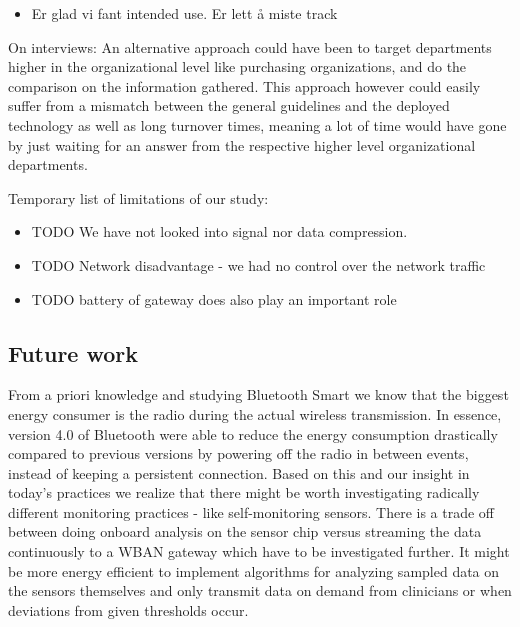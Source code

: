 \begin{itemize}

  \item Er glad vi fant intended use. Er lett å miste track 

\end{itemize}


On interviews: An alternative approach could have been to target departments higher in the organizational level like purchasing organizations, and do the comparison on the information gathered. This approach however could easily suffer from a mismatch between the general guidelines and the deployed technology as well as long turnover times, meaning a lot of time would have gone by just waiting for an answer from the respective higher level organizational departments.

Temporary list of limitations of our study:

\begin{itemize}

  \item TODO We have not looked into signal nor data compression.
  \item TODO Network disadvantage - we had no control over the network traffic
  \item TODO battery of gateway does also play an important role

\end{itemize}


\subsection{Future work} %
\label{sub:future_work}


From a priori knowledge and studying Bluetooth Smart we know that the biggest energy consumer is the radio during the actual wireless transmission. In essence, version 4.0 of Bluetooth were able to reduce the energy consumption drastically compared to previous versions by powering off the radio in between events, instead of keeping a persistent connection. Based on this and our insight in today's practices we realize that there might be worth investigating radically different monitoring practices - like self-monitoring sensors. There is a trade off between doing onboard analysis on the sensor chip versus streaming the data continuously to a WBAN gateway which have to be investigated further. It might be more energy efficient to implement algorithms for analyzing sampled data on the sensors themselves and only transmit data on demand from clinicians or when deviations from given thresholds occur.


